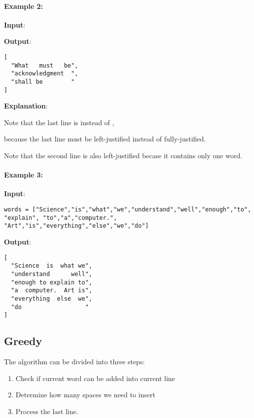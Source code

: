 \paragraph{Example 2:}
\begin{flushleft}

\textbf{Input}:



\textbf{Output}:
\begin{lstlisting}[style=customc]
[
  "What   must   be",
  "acknowledgment  ",
  "shall be        "
]
\end{lstlisting}

\textbf{Explanation}: 

Note that the last line is  instead of ,

because the last line must be left-justified instead of fully-justified.

Note that the second line is also left-justified becase it contains only one word.

\end{flushleft}

\paragraph{Example 3:}
\begin{flushleft}


\textbf{Input}:
\begin{lstlisting}[style=customc]
words = ["Science","is","what","we","understand","well","enough","to",
"explain", "to","a","computer.",
"Art","is","everything","else","we","do"]
\end{lstlisting}


\textbf{Output}:
\begin{lstlisting}[style=customc]
[
  "Science  is  what we",
  "understand      well",
  "enough to explain to",
  "a  computer.  Art is",
  "everything  else  we",
  "do                  "
]
\end{lstlisting}
\end{flushleft}

\subsection{Greedy}
The algorithm can be divided into three steps:
\begin{enumerate}
\item Check if current word can be added into current line
\item Determine how many spaces we need to insert
\item Process the last line.
\end{enumerate}

